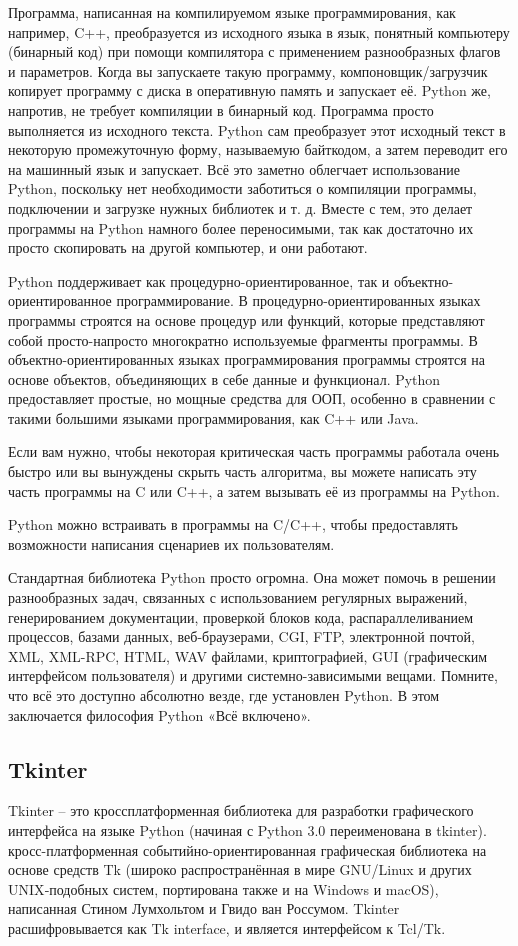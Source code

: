\documentclass[11pt,a4paper]{report}
\begin{document}
Программа, написанная на компилируемом языке программирования, как например, C++, преобразуется из исходного языка в язык, понятный компьютеру (бинарный код) при помощи компилятора с применением разнообразных флагов и параметров. Когда вы запускаете такую программу, компоновщик/загрузчик копирует программу с диска в оперативную память и запускает её.  Python же, напротив, не требует компиляции в бинарный код. Программа просто выполняется из исходного текста. Python сам преобразует этот исходный текст в некоторую промежуточную форму, называемую байткодом, а затем переводит его на машинный язык и запускает. Всё это заметно облегчает использование Python, поскольку нет необходимости заботиться о компиляции программы, подключении и загрузке нужных библиотек и т. д. Вместе с тем, это делает программы на Python намного более переносимыми, так как достаточно их просто скопировать на другой компьютер, и они работают.

Python поддерживает как процедурно-ориентированное, так и объектно-ориентированное программирование. В процедурно-ориентированных языках программы строятся на основе процедур или функций, которые представляют собой просто-напросто многократно используемые фрагменты программы. В объектно-ориентированных языках программирования программы строятся на основе объектов, объединяющих в себе данные и функционал. Python предоставляет простые, но мощные средства для ООП, особенно в сравнении с такими большими языками программирования, как C++ или Java.

Если вам нужно, чтобы некоторая критическая часть программы работала очень быстро или вы вынуждены скрыть часть алгоритма, вы можете написать эту часть программы на C или C++, а затем вызывать её из программы на Python.

Python можно встраивать в программы на C/C++, чтобы предоставлять возможности написания сценариев их пользователям.

Стандартная библиотека Python просто огромна. Она может помочь в решении разнообразных задач, связанных с использованием регулярных выражений, генерированием документации, проверкой блоков кода, распараллеливанием процессов, базами данных, веб-браузерами, CGI, FTP, электронной почтой, XML, XML-RPC, HTML, WAV файлами, криптографией, GUI (графическим интерфейсом пользователя) и другими системно-зависимыми вещами. Помните, что всё это доступно абсолютно везде, где установлен Python. В этом заключается философия Python «Всё включено».

\subsection{Tkinter}
Tkinter – это кроссплатформенная библиотека для разработки графического интерфейса на языке Python (начиная с Python 3.0 переименована в tkinter). кросс-платформенная событийно-ориентированная графическая библиотека на основе средств Tk (широко распространённая в мире GNU/Linux и других UNIX‐подобных систем, портирована также и на Windows и macOS), написанная Стином Лумхольтом и Гвидо ван Россумом. Tkinter расшифровывается как Tk interface, и является интерфейсом к Tcl/Tk.
\end{document}
